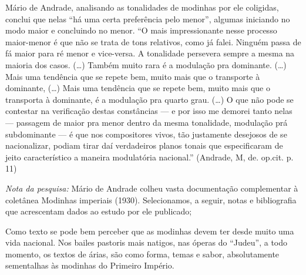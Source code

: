 Mário de Andrade, analisando as tonalidades de modinhas por ele
coligidas, conclui que nelas ``há uma certa preferência pelo menor'',
algumas iniciando no modo maior e concluindo no menor. ``O mais
impressionante nesse processo maior-menor é que não se trata de tons
relativos, como já falei. Ninguém passa de fá maior para ré menor e
vice-versa. A tonalidade persevera sempre a mesma na maioria dos casos.
(\ldots{}) Também muito rara é a modulação pra dominante. (\ldots{}) Mais uma
tendência que se repete bem, muito mais que o transporte à dominante,
(\ldots{}) Mais uma tendência que se repete bem, muito mais que o transporta
à dominante, é a modulação pra quarto grau. (\ldots{}) O que não pode se
contestar na verificação destas constâncias --- e por isso me demorei
tanto nelas --- passagem de maior pra menor dentro da mesma tonalidade,
modulação prá subdominante --- é que nos compositores vivos, tão
justamente desejosos de se nacionalizar, podiam tirar daí verdadeiros
planos tonais que especificaram de jeito característico a maneira
modulatória nacional.'' (Andrade, M, de. op.cit. p.\,11)

\textit{Nota da pesquisa:} Mário de Andrade colheu vasta documentação
complementar à coletânea Modinhas imperiais (1930). Selecionamos, a
seguir, notas e bibliografia que acrescentam dados ao estudo por ele
publicado;

Como texto se pode bem perceber que as modinhas devem ter desde muito
uma vida nacional. Nos bailes pastoris mais natigos, nas óperas do
``Judeu'', a todo momento, os textos de árias, são como forma, temas e
sabor, absolutamente sementalhas às modinhas do Primeiro Império.

